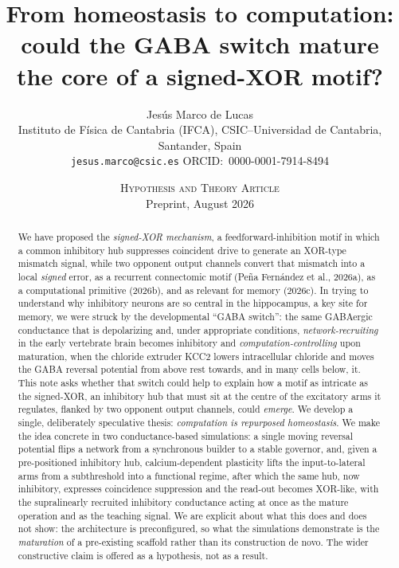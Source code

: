 \documentclass[11pt,a4paper]{article}
\title{\vspace{-1.6em}\textbf{From homeostasis to computation:\\[2pt]
could the GABA switch mature the core of a signed-XOR motif?}}
\author{Jes\'us Marco de Lucas\\[2pt]
\small Instituto de F\'isica de Cantabria (IFCA), CSIC--Universidad de Cantabria, Santander, Spain\\
\small \texttt{jesus.marco@csic.es} \quad ORCID:~0000-0001-7914-8494}
\date{\small \textsc{Hypothesis and Theory Article} \\ Preprint, August 2026}
\begin{document}
\maketitle
\vspace{-1.4em}

\begin{abstract}\noindent
We have proposed the \emph{signed-XOR mechanism}, a feedforward-inhibition motif in which a common inhibitory hub suppresses coincident drive to generate an XOR-type mismatch signal, while two opponent output channels convert that mismatch into a local \emph{signed} error, as a recurrent connectomic motif (Pe\~na Fern\'andez et al., 2026a), as a computational primitive (2026b), and as relevant for memory (2026c). In trying to understand why inhibitory neurons are so central in the hippocampus, a key site for memory, we were struck by the developmental ``GABA switch'': the same GABAergic conductance that is depolarizing and, under appropriate conditions, \emph{network-recruiting} in the early vertebrate brain becomes inhibitory and \emph{computation-controlling} upon maturation, when the chloride extruder KCC2 lowers intracellular chloride and moves the GABA reversal potential from above rest towards, and in many cells below, it. This note asks whether that switch could help to explain how a motif as intricate as the signed-XOR, an inhibitory hub that must sit at the centre of the excitatory arms it regulates, flanked by two opponent output channels, could \emph{emerge}. We develop a single, deliberately speculative thesis: \emph{computation is repurposed homeostasis}. 
We make the idea concrete in two conductance-based simulations: a single moving reversal potential flips a network from a synchronous builder to a stable governor, and, given a pre-positioned inhibitory hub, calcium-dependent
plasticity lifts the input-to-lateral arms from a subthreshold into a functional regime, after which the same hub, now inhibitory, expresses coincidence suppression and the read-out becomes XOR-like, with the supralinearly recruited inhibitory conductance acting at once as the mature operation and as the teaching signal. We are explicit about what this does and does not show: the architecture is preconfigured, so what the simulations demonstrate is the \emph{maturation} of a pre-existing scaffold rather than its construction de novo. The wider constructive claim is offered as a hypothesis, not as a result.

\end{abstract}
\end{document}
